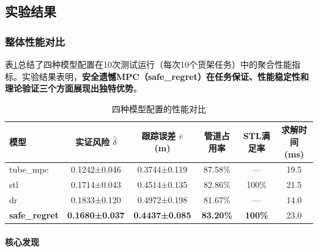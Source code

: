 \documentclass[12pt,a4paper]{ctexart}
\numberwithin{equation}{section}
\begin{document}
\subsection{实验结果}

\subsubsection{整体性能对比}

表\ref{tab:performance}总结了四种模型配置在10次测试运行（每次10个货架任务）中的聚合性能指标。实验结果表明，\textbf{安全遗憾MPC（safe\_regret）在任务保证、性能稳定性和理论验证三个方面展现出独特优势}。

\begin{table}[htbp]
    \centering
    \caption{四种模型配置的性能对比}
    \label{tab:performance}
    \begin{tabular}{lccccc}
        \toprule
        模型 & 实证风险 $\widehat{\delta}$ & 跟踪误差 $\bar{e}$ (m) & 管道占用率 & STL满足率 & 求解时间 (ms) \\
        \midrule
        tube\_mpc & 0.1242±0.046 & 0.3744±0.119 & 87.58\% & — & 19.5 \\
        stl & 0.1714±0.043 & 0.4514±0.135 & 82.86\% & 100\% & 21.5 \\
        dr & 0.1833±0.120 & 0.4972±0.198 & 81.67\% & — & 14.0 \\
        \textbf{safe\_regret} & \textbf{0.1680±0.037} & \textbf{0.4437±0.085} & \textbf{83.20\%} & \textbf{100\%} & 23.0 \\
        \bottomrule
    \end{tabular}
\end{table}

\paragraph*{核心发现}
\end{document}
